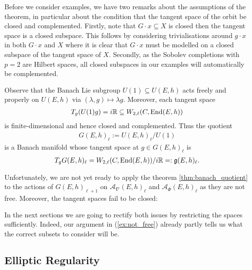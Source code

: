\documentclass[12pt]{ociamthesis}  %
\begin{document}
Before we consider examples, we have two remarks about the assumptions of the theorem,
in particular about the condition that the tangent space of the orbit be closed and
complemented. Firstly, note that $G\cdot x \subseteq X$ is closed then the tangent
space is a closed subspace. This follows by considering trivialisations around $g\cdot x$
in both $G\cdot x$ and $X$ where it is clear that $G\cdot x$ must be modelled on a closed
subspace of the tangent space of $X$. Secondly, as the Sobolev completions with $p=2$ are
Hilbert spaces, all closed subspaces in our examples will automatically be complemented.

\begin{example}
  Observe that the Banach Lie subgroup $U(1)\subseteq U(E,h)$ acts freely and properly
  on $U(E,h)$ via $(\lambda,g)\mapsto \lambda g$. Moreover, each tangent space
  \begin{align*}
    T_g(U(1)g) =
    i\mathbb{R} \subseteq W_{2,\ell}(C,\operatorname{End}(E,h))
  \end{align*}
  is finite-dimensional and hence closed and complemented.  Thus the quotient
  \begin{align*}
    G(E,h)_{\ell} := U(E,h)_\ell / U(1)
  \end{align*}
  is a Banach manifold whose tangent space at $g\in G(E,h)_\ell$ is
  \begin{align*}
    T_g G(E,h)_\ell =  W_{2,\ell}(C,\operatorname{End}(E,h))/i\mathbb{R} =: \mathfrak g(E,h)_\ell.
  \end{align*}
\end{example}

Unfortunately, we are not yet ready to apply the theorem \ref{thm:banach_quotient} to
the actions of $G(E,h)_{\ell+1}$ on $\mathcal A_\nabla(E,h)_\ell$ and
$\mathcal A_\Phi(E,h)_\ell$ as they are not free. Moreover, the tangent spaces fail to
be closed:

\begin{example}
  \missingexample
\end{example}

In the next sections we are going to rectify both issues by restricting the spaces
sufficiently. Indeed, our argument in (\ref{ex:not_free}) already partly tells us
what the correct subsets to consider will be.

\subsection{Elliptic Regularity}\label{sec:elliptic_regularity}
\end{document}
